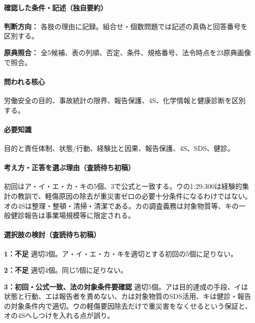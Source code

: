 \paragraph{確認した条件・記述（独自要約）}\mbox{}\par

\noindent\textbf{判断方向：} 各肢の理由に記録。組合せ・個数問題では記述の真偽と回答番号を区別する。\par

\noindent\textbf{原典照合：} 全5候補、表の列順、否定、条件、規格番号、法令時点を23原典画像で照合。\par

\paragraph{問われる核心} 労働安全の目的、事故統計の限界、報告保護、4S、化学情報と健康診断を区別する。

\paragraph{必要知識} 目的と責任体制、状態/行動、経験比と因果、報告保護、4S、SDS、健診。

\paragraph{考え方・正答を選ぶ理由（査読待ち初稿）} 初回はア・イ・エ・カ・キの5個、3で公式と一致する。ウの1:29:300は経験的集計の教訓で、軽傷原因の除去が重災害ゼロの必要十分条件になるわけではない。オの4Sは整理・整頓・清掃・清潔である。カの調査義務は対象物質等、キの一般健診報告は事業場規模等に限定される。

\paragraph{選択肢の検討（査読待ち初稿）}\mbox{}\par

\noindent\textbf{1：不足} 適切3個。ア・イ・エ・カ・キを適切とする初回の5個に足りない。\par

\noindent\textbf{2：不足} 適切4個。同じ5個に足りない。\par

\noindent\textbf{3：初回・公式一致、法の対象条件要確認} 適切5個。アは目的達成の手段、イは状態と行動、エは報告者を責めない、カは対象物質のSDS活用、キは健診・報告の対象条件内で適切。ウの軽傷要因除去だけで重災害をなくせるという保証と、オの4Sへしつけを入れる点が誤り。\par

